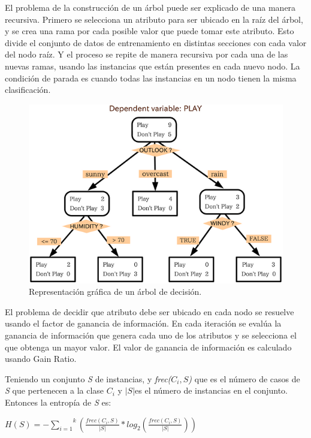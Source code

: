 El problema de la construcción de un árbol puede ser explicado de una manera recursiva. Primero se selecciona un atributo para ser ubicado en la raíz del árbol, y se crea una rama por cada posible valor que puede tomar este atributo. Esto divide el conjunto de datos de entrenamiento en distintas secciones con cada valor del nodo raíz. Y el proceso se repite de manera recursiva por cada una de las nuevas ramas, usando las instancias que están presentes en cada nuevo nodo. La condición de parada es cuando todas las instancias en un nodo tienen la misma clasificación\cite{key-210}.
\begin{figure}[H]
\begin{centering}
\includegraphics[scale=0.6]{c45}
\par\end{centering}
\caption{Representación gráfica de un árbol de decisión.}
\end{figure}
El problema de decidir que atributo debe ser ubicado en cada nodo se resuelve usando el factor de ganancia de información. En cada iteración se evalúa la ganancia de información que genera cada uno de los atributos y se selecciona el que obtenga un mayor valor. El valor de ganancia de información es calculado usando Gain Ratio.

Teniendo un conjunto \emph{S} de instancias, y \emph{frec($C_{i},S$)
}que es el número de casos de \emph{S} que pertenecen a la clase $C_{i}$
y $\left|S\right|$es el número de instancias en el conjunto. Entonces
la entropía de \emph{S }es:
\begin{center}
$H(S)=-\overset{k}{\underset{i=1}{\sum}}(\frac{frec(C_{i},S)}{|S|}*log_{2}(\frac{frec(C_{i},S)}{|S|}))$
\end{center}

